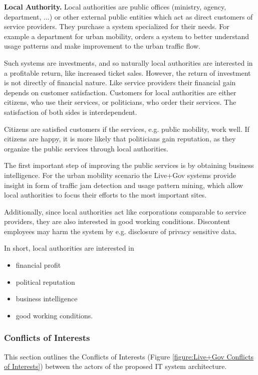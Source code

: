 \textbf{Local Authority.}
Local authorities are public offices (ministry, agency, department, ...) or other external public entities which act as direct customers of service providers.
They purchase a system specialized for their needs.
For example a department for urban mobility, orders a system to better understand usage patterns and make improvement to the urban traffic flow.

Such systems are investments, and so naturally local authorities are interested in a profitable return, like increased ticket sales.
However, the return of investment is not directly of financial nature.
Like service providers their financial gain depends on customer satisfaction.
Customers for local authorities are either citizens, who use their services, or politicians, who order their services.
The satisfaction of both sides is interdependent.

Citizens are satisfied customers if the services, e.g. public mobility, work well.
If citizens are happy, it is more likely that politicians gain reputation, as they organize the public services through local authorities.

The first important step of improving the public services is by obtaining business intelligence.
For the urban mobility scenario the Live+Gov systems provide insight in form of traffic jam detection and usage pattern mining, which allow local authorities to focus their efforts to the most important sites.

Additionally, since local authorities act like corporations comparable to service providers, they are also interested in good working conditions.
Discontent employees may harm the system by e.g. disclosure of privacy sensitive data.

In short, local authorities are interested in
\begin{itemize}
\item financial profit
\item political reputation
\item business intelligence
\item good working conditions.
\end{itemize}


\subsubsection{Conflicts of Interests}
\label{subsubsection:Conflicts of Interests}
This section outlines the Conflicts of Interests (Figure \ref{figure:Live+Gov Conflicts of Interests}) between the actors of the proposed IT system architecture.

